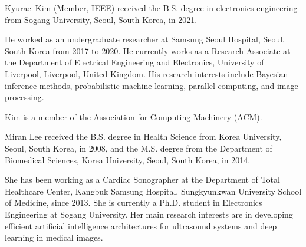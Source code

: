 
\vspace{-0.3in}
\begin{IEEEbiography}{Kyurae~Kim} (Member, IEEE) received the B.S. degree in electronics engineering from Sogang University, Seoul, South Korea, in 2021.

  He worked as an undergraduate researcher at Samsung Seoul Hospital, Seoul, South Korea from 2017 to 2020.
  He currently works as a Research Associate at the Department of Electrical Engineering and Electronics, University of Liverpool, Liverpool, United Kingdom.
  His research interests include Bayesian inference methods, probabilistic machine learning, parallel computing, and image processing.

  Kim is a member of the Association for Computing Machinery (ACM).
\end{IEEEbiography}
\vspace{-0.3in}

\begin{IEEEbiography}{Miran Lee} received the B.S. degree in Health Science from Korea University, Seoul, South Korea, in 2008, and the M.S. degree from the Department of Biomedical Sciences, Korea University, Seoul, South Korea, in 2014.

  She has been working as a Cardiac Sonographer at the Department of Total Healthcare Center, Kangbuk Samsung Hospital, Sungkyunkwan University School of Medicine, since 2013.
  She is currently a Ph.D. student in Electronics Engineering at Sogang University. 
  Her main research interests are in developing efficient artificial intelligence architectures for ultrasound systems and deep learning in medical images.
\end{IEEEbiography}
\vspace{-0.3in}

